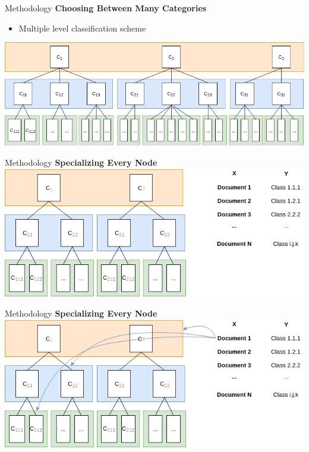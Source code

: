 \begin{frame}[label=metho]{Methodology}
	\textbf{Choosing Between Many Categories}
	\begin{itemize}
		\item Multiple level classification scheme 
	\end{itemize}
	
	\includegraphics[width=\textwidth]{images/hierarchical_classification.png}
	

\end{frame}


\begin{frame}[label=metho]{Methodology}
	\textbf{Specializing Every Node}
	\includegraphics[width=\textwidth]{images/distribution_0.png}
\end{frame}


\begin{frame}[label=metho]{Methodology}
	\textbf{Specializing Every Node}
	\includegraphics[width=\textwidth]{images/distribution_1.png}
\end{frame}


